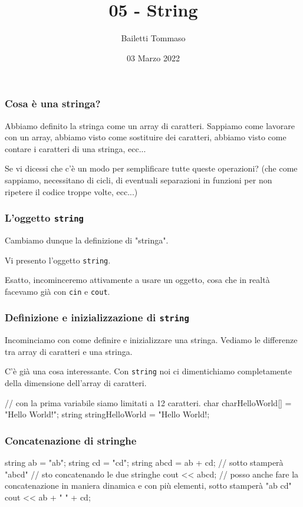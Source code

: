 \documentclass{beamer}
\title{05 - String}
\author{Bailetti Tommaso}
\institute{ITI Don Orione}
\date{03 Marzo 2022}
\begin{document}
    \begin{frame}
        \titlepage
    \end{frame}
    
    \begin{frame}
        \frametitle{Cosa è una stringa?}
    
        Abbiamo definito la stringa come un array di caratteri. Sappiamo come lavorare con un array, abbiamo visto come sostituire dei caratteri, abbiamo visto come contare i caratteri di una stringa, ecc...

        Se vi dicessi che c'è un modo per semplificare tutte queste operazioni? (che come sappiamo, necessitano di cicli, di eventuali separazioni in funzioni per non ripetere il codice troppe volte, ecc...)
    
    \end{frame}

    \begin{frame}[fragile]
        \frametitle{L'oggetto \texttt{string}}
    
        Cambiamo dunque la definizione di "stringa".
        
        Vi presento l'oggetto \texttt{string}.

        Esatto, incominceremo attivamente a usare un oggetto, cosa che in realtà facevamo già con \texttt{cin} e \texttt{cout}.
    \end{frame}

    \begin{frame}[fragile]
        \frametitle{Definizione e inizializzazione di \texttt{string}}

        Incominciamo con come definire e inizializzare una stringa. Vediamo le differenze tra array di caratteri e una stringa.

        C'è già una cosa interessante. Con \texttt{string} noi ci dimentichiamo completamente della dimensione dell'array di caratteri.
        \begin{cppcode}
            // con la prima variabile siamo limitati a 12 caratteri.
            char charHelloWorld[] = "Hello World!";
            string stringHelloWorld = "Hello World!;
        \end{cppcode}
    
    \end{frame}

    \begin{frame}[fragile]
        \frametitle{Concatenazione di stringhe}
    
        \begin{cppcode}
            string ab = "ab";
            string cd = "cd";
            string abcd = ab + cd;
            // sotto stamperà "abcd"
            // sto concatenando le due stringhe
            cout << abcd;
            // posso anche fare la concatenazione in maniera dinamica e con più elementi, sotto stamperà "ab cd"
            cout << ab + " " + cd;
        \end{cppcode}
    
    \end{frame}
\end{document}
